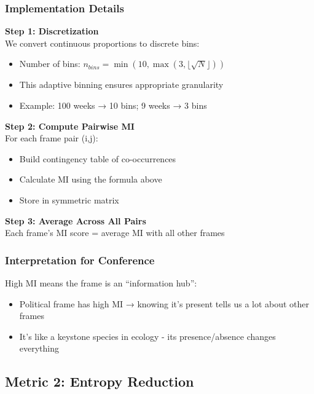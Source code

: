 \documentclass[11pt]{article}
\begin{document}
\subsubsection{Implementation Details}

\begin{tcolorbox}[mybox={Technical Implementation}]
\textbf{Step 1: Discretization}\\
We convert continuous proportions to discrete bins:
\begin{itemize}
    \item Number of bins: $n_{bins} = \min(10, \max(3, \lfloor\sqrt{N}\rfloor))$
    \item This adaptive binning ensures appropriate granularity
    \item Example: 100 weeks → 10 bins; 9 weeks → 3 bins
\end{itemize}

\textbf{Step 2: Compute Pairwise MI}\\
For each frame pair (i,j):
\begin{itemize}
    \item Build contingency table of co-occurrences
    \item Calculate MI using the formula above
    \item Store in symmetric matrix
\end{itemize}

\textbf{Step 3: Average Across All Pairs}\\
Each frame's MI score = average MI with all other frames
\end{tcolorbox}

\subsubsection{Interpretation for Conference}

High MI means the frame is an ``information hub'':
\begin{itemize}
    \item Political frame has high MI → knowing it's present tells us a lot about other frames
    \item It's like a keystone species in ecology - its presence/absence changes everything
\end{itemize}

\subsection{Metric 2: Entropy Reduction}
\end{document}
